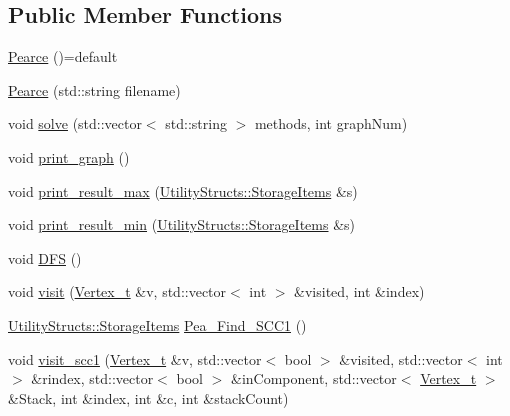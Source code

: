 \subsection*{Public Member Functions}
\begin{DoxyCompactItemize}
\item 
\hyperlink{class_pearce_a4ad24a40c64e8f3481dd0dbbcb8d2bcb_a4ad24a40c64e8f3481dd0dbbcb8d2bcb}{Pearce} ()=default
\item 
\hyperlink{class_pearce_a0851b1b696528448c1a42dbb6b4e6c8f_a0851b1b696528448c1a42dbb6b4e6c8f}{Pearce} (std\+::string filename)
\item 
void \hyperlink{class_pearce_a7c6ea7dde3dc3e127e4fc6ad1892974e_a7c6ea7dde3dc3e127e4fc6ad1892974e}{solve} (std\+::vector$<$ std\+::string $>$ methods, int graph\+Num)
\item 
void \hyperlink{class_pearce_a96ed7e50d992838177699b6133464554_a96ed7e50d992838177699b6133464554}{print\+\_\+graph} ()
\item 
void \hyperlink{class_pearce_aaa906779c670a16948c00a9c031e6986_aaa906779c670a16948c00a9c031e6986}{print\+\_\+result\+\_\+max} (\hyperlink{struct_utility_structs_1_1_storage_items}{Utility\+Structs\+::\+Storage\+Items} \&s)
\item 
void \hyperlink{class_pearce_af2a6f31643617305794c06b5d2c85ebe_af2a6f31643617305794c06b5d2c85ebe}{print\+\_\+result\+\_\+min} (\hyperlink{struct_utility_structs_1_1_storage_items}{Utility\+Structs\+::\+Storage\+Items} \&s)
\item 
void \hyperlink{class_pearce_ad50f62a493ed2b5eb7fcb3c0f8e2e079_ad50f62a493ed2b5eb7fcb3c0f8e2e079}{D\+FS} ()
\item 
void \hyperlink{class_pearce_ac5e668d0d21ee0dad33cea171b9e2022_ac5e668d0d21ee0dad33cea171b9e2022}{visit} (\hyperlink{class_graph_component_ae67114a6ce5a001dc35e1996e1b45aa0_ae67114a6ce5a001dc35e1996e1b45aa0}{Vertex\+\_\+t} \&v, std\+::vector$<$ int $>$ \&visited, int \&index)
\item 
\hyperlink{struct_utility_structs_1_1_storage_items}{Utility\+Structs\+::\+Storage\+Items} \hyperlink{class_pearce_a4a78c1ec037146537f575fa62b1e0265_a4a78c1ec037146537f575fa62b1e0265}{Pea\+\_\+\+Find\+\_\+\+S\+C\+C1} ()
\item 
void \hyperlink{class_pearce_ae4e9364dd0c829564ecfbfe8ccc07b6a_ae4e9364dd0c829564ecfbfe8ccc07b6a}{visit\+\_\+scc1} (\hyperlink{class_graph_component_ae67114a6ce5a001dc35e1996e1b45aa0_ae67114a6ce5a001dc35e1996e1b45aa0}{Vertex\+\_\+t} \&v, std\+::vector$<$ bool $>$ \&visited, std\+::vector$<$ int $>$ \&rindex, std\+::vector$<$ bool $>$ \&in\+Component, std\+::vector$<$ \hyperlink{class_graph_component_ae67114a6ce5a001dc35e1996e1b45aa0_ae67114a6ce5a001dc35e1996e1b45aa0}{Vertex\+\_\+t} $>$ \&Stack, int \&index, int \&c, int \&stack\+Count)

\end{DoxyCompactItemize}
